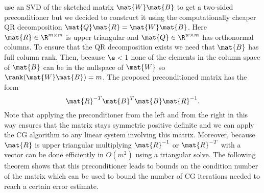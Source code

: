 \Textcite{Avron-FasterRandomizedInfeasibleIPMs} use an SVD of the sketched matrix \(\mat{W}\mat{B}\) to get a two-sided preconditioner but we decided to construct it using the computationally cheaper QR decomposition \(\mat{Q}\mat{R} = \mat{W}\mat{B}\).
Here \(\mat{R} \in \R^{m \times m}\) is upper triangular and \(\mat{Q} \in \R^{w \times m}\) has orthonormal columns.
To ensure that the QR decomposition exists we need that \(\mat{B}\) has full column rank. Then, because \(\e < 1\) none of the elements in the column space of \(\mat{B}\) can be in the nullspace of \(\mat{W}\) so \(\rank(\mat{W}\mat{B}) = m\).
The proposed preconditioned matrix has the form
\begin{equation}\label{eqn:preconditioned-matrix}
 \mat{R}^{-T} \mat{B}^T \mat{B} \mat{R}^{-1}.
\end{equation}
Note that applying the preconditioner from the left and from the right in this way ensures that the matrix stays symmetric positive definite and we can apply the CG algorithm to any linear system involving this matrix.
Moreover, because \(\mat{R}\) is upper triangular multiplying \(\mat{R}^{-1}\) or \(\mat{R}^{-T}\) with a vector can be done efficiently in \(O(m^2)\) using a triangular solve.
The following theorem shows that this preconditioner leads to bounds on the condition number of the matrix which can be used to bound the number of CG iterations needed to reach a certain error estimate.

